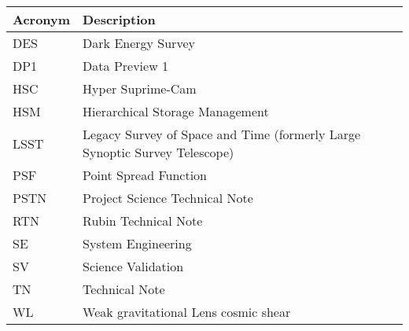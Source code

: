 \addtocounter{table}{-1}
\begin{longtable}{p{}p{}}\hline
\textbf{Acronym} & \textbf{Description}  \\\hline

DES & Dark Energy Survey \\\hline
DP1 & Data Preview 1 \\\hline
HSC & Hyper Suprime-Cam \\\hline
HSM & Hierarchical Storage Management \\\hline
LSST & Legacy Survey of Space and Time (formerly Large Synoptic Survey Telescope) \\\hline
PSF & Point Spread Function \\\hline
PSTN & Project Science Technical Note \\\hline
RTN & Rubin Technical Note \\\hline
SE & System Engineering \\\hline
SV & Science Validation \\\hline
TN & Technical Note \\\hline
WL & Weak gravitational Lens cosmic shear \\\hline
\end{longtable}
